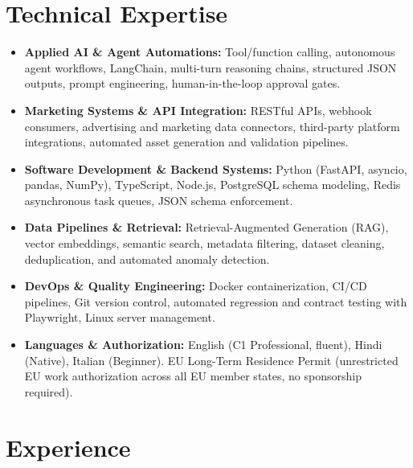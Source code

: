 \documentclass[10pt,a4paper]{article}
\begin{document}
\section{Technical Expertise}
\begin{itemize}
  \item \textbf{Applied AI \& Agent Automations:} Tool/function calling, autonomous agent workflows, LangChain, multi-turn reasoning chains, structured JSON outputs, prompt engineering, human-in-the-loop approval gates.
  \item \textbf{Marketing Systems \& API Integration:} RESTful APIs, webhook consumers, advertising and marketing data connectors, third-party platform integrations, automated asset generation and validation pipelines.
  \item \textbf{Software Development \& Backend Systems:} Python (FastAPI, asyncio, pandas, NumPy), TypeScript, Node.js, PostgreSQL schema modeling, Redis asynchronous task queues, JSON schema enforcement.
  \item \textbf{Data Pipelines \& Retrieval:} Retrieval-Augmented Generation (RAG), vector embeddings, semantic search, metadata filtering, dataset cleaning, deduplication, and automated anomaly detection.
  \item \textbf{DevOps \& Quality Engineering:} Docker containerization, CI/CD pipelines, Git version control, automated regression and contract testing with Playwright, Linux server management.
  \item \textbf{Languages \& Authorization:} English (C1 Professional, fluent), Hindi (Native), Italian (Beginner). EU Long-Term Residence Permit (unrestricted EU work authorization across all EU member states, no sponsorship required).
\end{itemize}

\section{Experience}
\end{document}
